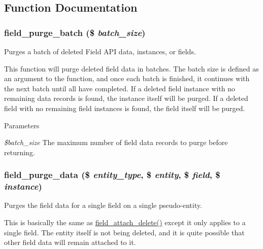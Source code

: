 \subsection{Function Documentation}
\hypertarget{group__field__purge_gac0dcacb53338e25ac4e2add6b427757e}{
\subsubsection[{field\_\-purge\_\-batch}]{\setlength{\rightskip}{0pt plus 5cm}field\_\-purge\_\-batch (\$ {\em batch\_\-size})}}
\label{group__field__purge_gac0dcacb53338e25ac4e2add6b427757e}
Purges a batch of deleted Field API data, instances, or fields.

This function will purge deleted field data in batches. The batch size is defined as an argument to the function, and once each batch is finished, it continues with the next batch until all have completed. If a deleted field instance with no remaining data records is found, the instance itself will be purged. If a deleted field with no remaining field instances is found, the field itself will be purged.


\begin{DoxyParams}{Parameters}
\item[{\em \$batch\_\-size}]The maximum number of field data records to purge before returning. \end{DoxyParams}
\hypertarget{group__field__purge_ga93ec2f273b56141a5079bfaf25d6b80e}{
\subsubsection[{field\_\-purge\_\-data}]{\setlength{\rightskip}{0pt plus 5cm}field\_\-purge\_\-data (\$ {\em entity\_\-type}, \/  \$ {\em entity}, \/  \$ {\em field}, \/  \$ {\em instance})}}
\label{group__field__purge_ga93ec2f273b56141a5079bfaf25d6b80e}
Purges the field data for a single field on a single pseudo-\/entity.

This is basically the same as \hyperlink{group__field__attach_gac2e3658c9c02d0d0e71359f9ef2f207a}{field\_\-attach\_\-delete()} except it only applies to a single field. The entity itself is not being deleted, and it is quite possible that other field data will remain attached to it.


